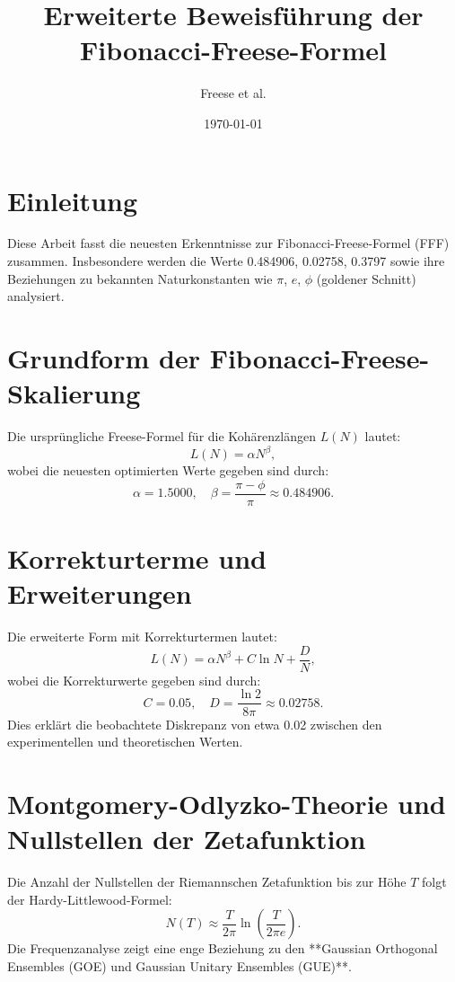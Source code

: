\documentclass[a4paper,12pt]{article}
\title{Erweiterte Beweisführung der Fibonacci-Freese-Formel}
\author{Freese et al.}
\date{\today}
\begin{document}
\maketitle

\section{Einleitung}
Diese Arbeit fasst die neuesten Erkenntnisse zur Fibonacci-Freese-Formel (FFF) zusammen. Insbesondere werden die Werte 0.484906, 0.02758, 0.3797 sowie ihre Beziehungen zu bekannten Naturkonstanten wie $\pi$, $e$, $\phi$ (goldener Schnitt) analysiert.

\section{Grundform der Fibonacci-Freese-Skalierung}
Die ursprüngliche Freese-Formel für die Kohärenzlängen \(L(N)\) lautet:
\begin{equation}
    L(N) = \alpha N^{\beta},
\end{equation}
wobei die neuesten optimierten Werte gegeben sind durch:
\begin{equation}
    \alpha = 1.5000, \quad \beta = \frac{\pi - \phi}{\pi} \approx 0.484906.
\end{equation}

\section{Korrekturterme und Erweiterungen}
Die erweiterte Form mit Korrekturtermen lautet:
\begin{equation}
    L(N) = \alpha N^{\beta} + C \ln N + \frac{D}{N},
\end{equation}
wobei die Korrekturwerte gegeben sind durch:
\begin{equation}
    C = 0.05, \quad D = \frac{\ln 2}{8\pi} \approx 0.02758.
\end{equation}
Dies erklärt die beobachtete Diskrepanz von etwa 0.02 zwischen den experimentellen und theoretischen Werten.

\section{Montgomery-Odlyzko-Theorie und Nullstellen der Zetafunktion}
Die Anzahl der Nullstellen der Riemannschen Zetafunktion bis zur Höhe \(T\) folgt der Hardy-Littlewood-Formel:
\begin{equation}
    N(T) \approx \frac{T}{2\pi} \ln \left(\frac{T}{2\pi e}\right).
\end{equation}
Die Frequenzanalyse zeigt eine enge Beziehung zu den **Gaussian Orthogonal Ensembles (GOE) und Gaussian Unitary Ensembles (GUE)**.
\end{document}
